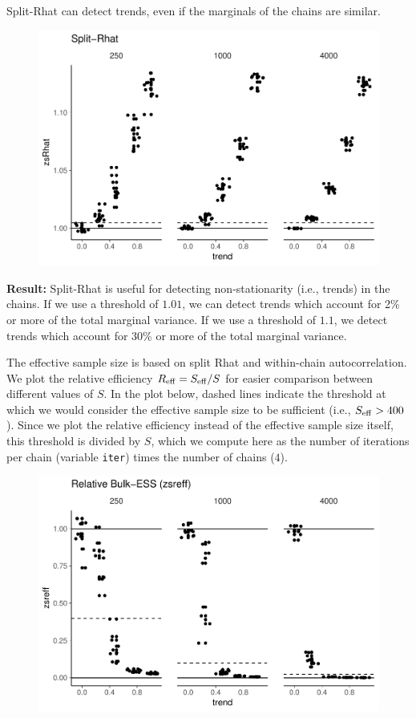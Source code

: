 \documentclass[american,]{article}
\begin{document}
Split-Rhat can detect trends, even if the marginals of the chains are
similar.

\begin{figure}[tp]
  \centering
  \includegraphics[width=0.6\linewidth]{graphics/zsrhat-same-trend-1.pdf}
\end{figure}

\textbf{Result:} Split-Rhat is useful for detecting non-stationarity
(i.e., trends) in the chains. If we use a threshold of \(1.01\), we can
detect trends which account for 2\% or more of the total marginal
variance. If we use a threshold of \(1.1\), we detect trends which
account for 30\% or more of the total marginal variance.

The effective sample size is based on split Rhat and within-chain
autocorrelation. We plot the relative efficiency
\(R_{\rm eff}=S_{\rm eff}/S\) for easier comparison between different
values of \(S\). In the plot below, dashed lines indicate the threshold
at which we would consider the effective sample size to be sufficient
(i.e., \(S_{\rm eff} > 400\)). Since we plot the relative efficiency
instead of the effective sample size itself, this threshold is divided
by \(S\), which we compute here as the number of iterations per chain
(variable \texttt{iter}) times the number of chains (\(4\)).

\begin{figure}[tp]
  \centering
  \includegraphics[width=0.6\linewidth]{graphics/zsreff-same-trend-1.pdf}
\end{figure}
\end{document}
